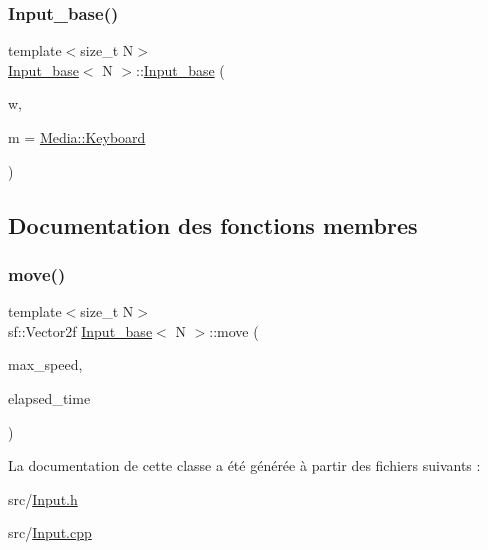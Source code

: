 \subsubsection{\texorpdfstring{Input\+\_\+base()}{Input\_base()}}
{\footnotesize\ttfamily template$<$size\+\_\+t N$>$ \\
\hyperlink{class_input__base}{Input\+\_\+base}$<$ N $>$\+::\hyperlink{class_input__base}{Input\+\_\+base} (\begin{DoxyParamCaption}\item[{const sf\+::\+Render\+Window \&}]{w,  }\item[{\hyperlink{class_input__base_a455585e7933485981b3d7bfcad3a47c6}{Media}}]{m = {\ttfamily \hyperlink{class_input__base_a455585e7933485981b3d7bfcad3a47c6a6ce4d85a628a88bbdb3ac24a8e5a9c2e}{Media\+::\+Keyboard}} }\end{DoxyParamCaption})\hspace{0.3cm}{\ttfamily [explicit]}}



\subsection{Documentation des fonctions membres}
\mbox{\label{class_input__base_a157b2510537e9f9ee1c29726456541e4}} 
\subsubsection{\texorpdfstring{move()}{move()}}
{\footnotesize\ttfamily template$<$size\+\_\+t N$>$ \\
sf\+::\+Vector2f \hyperlink{class_input__base}{Input\+\_\+base}$<$ N $>$\+::move (\begin{DoxyParamCaption}\item[{float}]{max\+\_\+speed,  }\item[{const sf\+::\+Time \&}]{elapsed\+\_\+time }\end{DoxyParamCaption})}



La documentation de cette classe a été générée à partir des fichiers suivants \+:\begin{DoxyCompactItemize}
\item 
src/\hyperlink{_input_8h}{Input.\+h}\item 
src/\hyperlink{_input_8cpp}{Input.\+cpp}\end{DoxyCompactItemize}
